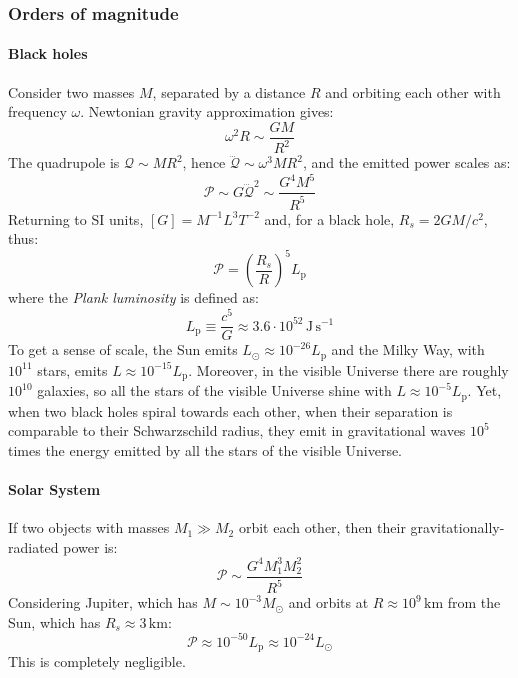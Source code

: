 \subsubsection{Orders of magnitude}

\paragraph{Black holes}

Consider two masses $ M $, separated by a distance $ R $ and orbiting each other with frequency $ \omega $. Newtonian gravity approximation gives:
\begin{equation*}
  \omega^2 R \sim \frac{GM}{R^2}
\end{equation*}
The quadrupole is $ \mathcal{Q} \sim M R^2 $, hence $ \dddot{\mathcal{Q}} \sim \omega^3 M R^2 $, and the emitted power scales as:
\begin{equation*}
  \mathcal{P} \sim G \dddot{\mathcal{Q}}^2 \sim \frac{G^4 M^5}{R^5}
\end{equation*}
Returning to SI units, $ [G] = M^{-1} L^3 T^{-2} $ and, for a black hole, $ R_s = 2GM / c^2 $, thus:
\begin{equation*}
  \mathcal{P} = \left( \frac{R_s}{R} \right)^5 L_{\text{p}}
\end{equation*}
where the \textit{Plank luminosity} is defined as:
\begin{equation*}
  L_{\text{p}} \equiv \frac{c^5}{G} \approx 3.6 \cdot 10^{52} \,\text{J}\,\text{s}^{-1}
\end{equation*}
To get a sense of scale, the Sun emits $ L_{\odot} \approx 10^{-26} L_{\text{p}} $ and the Milky Way, with $ 10^{11} $ stars, emits $ L \approx 10^{-15} L_{\text{p}} $. Moreover, in the visible Universe there are roughly $ 10^{10} $ galaxies, so all the stars of the visible Universe shine with $ L \approx 10^{-5} L_{\text{p}} $. Yet, when two black holes spiral towards each other, when their separation is comparable to their Schwarzschild radius, they emit in gravitational waves $ 10^5 $ times the energy emitted by all the stars of the visible Universe.

\paragraph{Solar System}

If two objects with masses $ M_1 \gg M_2 $ orbit each other, then their gravitationally-radiated power is:
\begin{equation*}
  \mathcal{P} \sim \frac{G^4 M_1^3 M_2^2}{R^5}
\end{equation*}
Considering Jupiter, which has $ M \sim 10^{-3} M_{\odot} $ and orbits at $ R \approx 10^9\,\text{km} $ from the Sun, which has $ R_s \approx 3\,\text{km} $:
\begin{equation*}
  \mathcal{P} \approx 10^{-50} L_{\text{p}} \approx 10^{-24} L_{\odot}
\end{equation*}
This is completely negligible.

